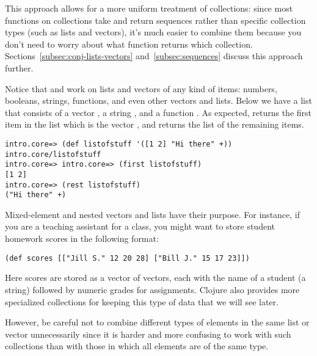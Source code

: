 This approach allows for a more uniform treatment of collections: since most functions on collections take and return sequences rather than specific collection types (such as lists and vectors), it's much easier to combine them because you don't need to worry about what function returns which collection. Sections~\ref{subsec:conj-lists-vectors} and~\ref{subsec:sequences} discuss this approach further. 



Notice that  and  work on lists and vectors of any kind of items: numbers, booleans, strings, functions, and even other vectors and lists. Below we have a list that consists of a vector \clocode{[1 2]}, a string , and a function \clocode{+}. As expected,  returns the first item in the list which is the vector \clocode{[1 2]}, and  returns the list of the remaining items. 
\begin{framed}
\begin{verbatim}
intro.core=> (def listofstuff '([1 2] "Hi there" +))
intro.core/listofstuff
intro.core=> intro.core=> (first listofstuff)
[1 2]
intro.core=> (rest listofstuff)
("Hi there" +)
\end{verbatim}
\end{framed}

Mixed-element and nested vectors and lists have their purpose. For instance, if you are a teaching assistant for a class, you might want to store student homework scores in the following format:
\begin{framed}
\begin{verbatim}
(def scores [["Jill S." 12 20 28] ["Bill J." 15 17 23]])
\end{verbatim}
\end{framed}
Here scores are stored as a vector of vectors, each with the name of a student (a string) followed by numeric grades for assignments. Clojure also provides more specialized collections for keeping this type of data that we will see later. 

However, be careful not to combine  different types of elements in the same list or vector unnecessarily since it is harder and more confusing to work with such collections than with those in which all elements are of the same type. 

